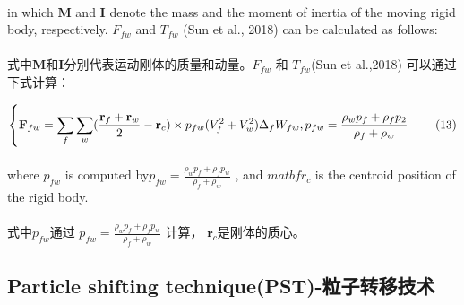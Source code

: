 \documentclass[UTF8]{ctexart}
\begin{document}
{{\paragraph{\quad}in which $\mathbf{M}$ and $\mathbf{I}$ denote the mass and the moment of 
                inertia of the moving rigid body, 
                respectively. $F_{fw}$ and $T_{fw}$ (Sun et al., 2018) can be calculated as follows:
\paragraph{\quad}式中$\mathbf{M}$和$\mathbf{I}$分别代表运动刚体的质量和动量。$F_{fw}$ 和 $T_{fw}$(Sun et al.,2018)
                可以通过下式计算：

\begin{equation}
   \left\{ \mathbf{F}_{fw} = \sum_{f}\sum_{w}(\frac{\mathbf{r}_f+\mathbf{r}_w}{2}-\mathbf{r}_c)\times p_{fw}(V_f^2+V_w^2)\Delta_f W_{fw}, \\
   p_{fw}=\frac{\rho_w p_f+\rho_f p_2}{\rho_f+\rho_w} \right. \qquad (13)
\end{equation}

\paragraph{\quad}where $p_{fw}$ is computed by$ p_{fw} = \frac{\rho_w p_f +\rho_f p_w}{ \rho_f +\rho_w}$ , 
                and $matbf{r}_c$ is the centroid position of the rigid body.
\paragraph{\quad}式中$p_{fw}$通过 $ p_{fw} = \frac{\rho_w p_f +\rho_f p_w}{ \rho_f +\rho_w}$ 计算，
                $\mathbf{r}_c$是刚体的质心。

\subsection{Particle shifting technique(PST)-粒子转移技术}
}}
\end{document}
